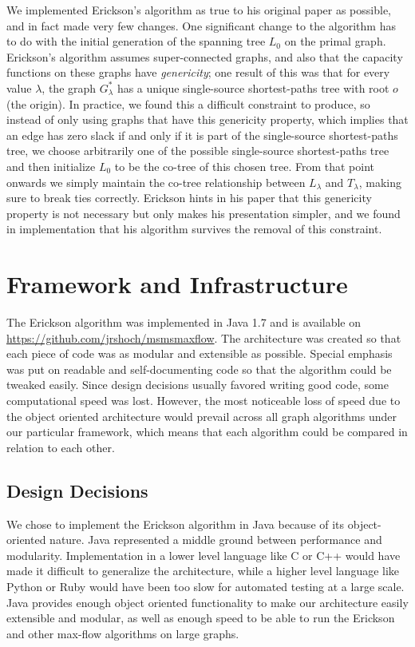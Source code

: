 \documentclass[12pt]{article}
\begin{document}
We implemented Erickson's algorithm as true to his original paper as possible, and in fact made very few changes.  One significant change to the algorithm has to do with the initial generation of the spanning tree $L_0$ on the primal graph.  Erickson's algorithm assumes super-connected graphs, and also that the capacity functions on these graphs have \emph{genericity}; one result of this was that for every value $\lambda$, the graph $G_\lambda^*$ has a unique single-source shortest-paths tree with root $o$ (the origin).  In practice, we found this a difficult constraint to produce, so instead of only using graphs that have this genericity property, which implies that an edge has zero slack if and only if it is part of the single-source shortest-paths tree, we choose arbitrarily one of the possible single-source shortest-paths tree and then initialize $L_0$ to be the co-tree of this chosen tree.  From that point onwards we simply maintain the co-tree relationship between $L_\lambda$ and $T_\lambda$, making sure to break ties correctly.  Erickson hints in his paper that this genericity property is not necessary but only makes his presentation simpler, and we found in implementation that his algorithm survives the removal of this constraint.

\section{Framework and Infrastructure}

The Erickson algorithm was implemented in Java 1.7 and is available on \url{https://github.com/jrshoch/msmsmaxflow}. The architecture was created so that each piece of code was as modular and extensible as possible. Special emphasis was put on readable and self-documenting code so that the algorithm could be tweaked easily. Since design decisions usually favored writing good code, some computational speed was lost. However, the most noticeable loss of speed due to the object oriented architecture would prevail across all graph algorithms under our particular framework, which means that each algorithm could be compared in relation to each other.

\subsection{Design Decisions}

We chose to implement the Erickson algorithm in Java because of its object-oriented nature. Java represented a middle ground between performance and modularity. Implementation in a lower level language like C or C++ would have made it difficult to generalize the architecture, while a higher level language like Python or Ruby would have been too slow for automated testing at a large scale. Java provides enough object oriented functionality to make our architecture easily extensible and modular, as well as enough speed to be able to run the Erickson and other max-flow algorithms on large graphs.
\end{document}
